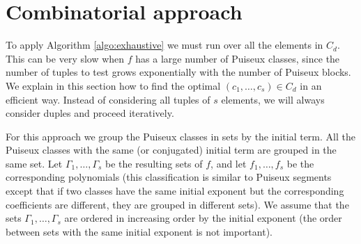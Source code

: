 \documentclass[a4paper,11pt]{amsart}%
\theoremstyle{definition}
\theoremstyle{plain}
\theoremstyle{remark}
\begin{document}
\section{Combinatorial approach}

%
%
%
%

To apply Algorithm \ref{algo:exhaustive} we must run over all the elements
in $C_{d}$. This can be very slow when $f$ has a large number of Puiseux classes, since the number of tuples to test grows exponentially with the number of Puiseux blocks.
We explain in this section how to find the optimal $(c_{1}, \dots, c_{s}) \in C_{d}$ in an
efficient way. Instead of considering all tuples of $s$ elements, we will always
consider duples and proceed iteratively.

For this approach we group the Puiseux classes in sets by the initial term. All the Puiseux classes with the same (or conjugated) initial term are grouped in the same set. Let $\Gamma_1, \dots, \Gamma_s$ be the resulting sets of $f$, and let $f_1, \dots, f_s$ be the corresponding polynomials (this classification is similar to Puiseux segments except that if two classes have the same initial exponent but the corresponding coefficients are different, they are grouped in different sets).
We assume that the sets $\Gamma_1, \dots, \Gamma_s$ are ordered in increasing order by the initial exponent (the order between sets with the same initial exponent is not important).
\end{document}
